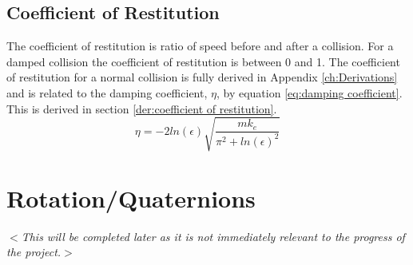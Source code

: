 \documentclass[10pt,a4paper,titlepage]{report}
\begin{document}
\subsection{Coefficient of Restitution}
The coefficient of restitution is ratio of speed before and after a collision. For a damped collision the coefficient of restitution is between 0 and 1. The coefficient of restitution for a normal collision is fully derived in Appendix \ref{ch:Derivations} and is related to the damping coefficient, $\eta$, by equation \ref{eq:damping coefficient}. This is derived in section \ref{der:coefficient of restitution}.
\begin{equation}
\eta = - 2 ln(\epsilon) \sqrt{\dfrac{m k_e}{\pi^2 + ln(\epsilon)^2}}
\label{eq:damping coefficient}
\end{equation}
\section{Rotation/Quaternions}
\textit{$<$This will be completed later as it is not immediately relevant to the progress of the project.$>$}
\end{document}
